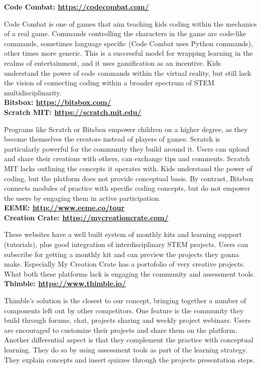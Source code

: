 \textbf{Code Combat: \url{https://codecombat.com/}}

Code Combat is one of games that aim teaching kids coding within the mechanics of a real game. Commands controlling the characters in the game are code-like commands, sometimes language specific (Code Combat uses Python commands), other times more generic. 
This is a successful model for wrapping learning in the realms of entertainment, and it uses gamification as an incentive. Kids understand the power of code commands within the virtual reality, but still lack the vision of connecting coding within a broader spectrum of STEM multidisciplinarity.\\

\textbf{Bitsbox: \url{https://bitsbox.com/}} \\
\textbf{Scratch MIT: \url{https://scratch.mit.edu/}}

Programs like Scratch or Bitsbox empower children on a higher degree, as they become themselves the creators instead of players of games. 
Scratch is particularly powerful for the community they build around it. Users can upload and share their creations with others, can exchange tips and comments. 
Scratch MIT lacks outlining the concepts it operates with. Kids understand the power of coding, but the platform does not provide conceptual basis.
By contrast, Bitsbox connects modules of practice with specific coding concepts, but do not empower the users by engaging them in active participation. \\

\textbf{EEME: \url{http://www.eeme.co/tour}} \\
\textbf{Creation Crate: \url{https://mycreationcrate.com/}}

These websites have a well built system of monthly kits and learning support (tutorials), plus good integration of interdisciplinary STEM projects. Users can subscribe for getting a monthly kit and can preview the projects they gonna make. Especially My Creation Crate has a portofolio of very creative projects.
What both these platforms lack is engaging the community and assessment tools.\\

\textbf{Thimble: \url{https://www.thimble.io/}}

Thimble's solution is the closest to our concept, bringing together a number of components left out by other competitors. 
One feature is the community they build through forums, chat, projects sharing and weekly project webinars. Users are encouraged to customize their projects and share them on the platform. 
Another differential aspect is that they complement the practice with conceptual learning. They do so by using assessment tools as part of the learning strategy. They explain concepts and insert quizzes through the projects presentation steps.\\


